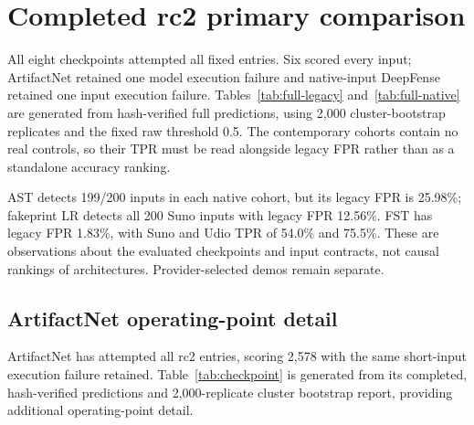 \documentclass[10pt,a4paper]{article}
\begin{document}
\section{Completed rc2 primary comparison}

All eight checkpoints attempted all \BenchEntries{} fixed entries. Six scored
every input; ArtifactNet retained one model execution failure and native-input
DeepFense retained one input execution failure. Tables~\ref{tab:full-legacy}
and~\ref{tab:full-native} are generated from hash-verified full predictions,
using 2,000 cluster-bootstrap replicates and the fixed raw threshold 0.5.
The contemporary cohorts contain no real controls, so their TPR must be read
alongside legacy FPR rather than as a standalone accuracy ranking.

\begin{table}[ht]
\centering\small
\resizebox{\linewidth}{!}{}
\caption{Completed legacy comparison. Failed entries remain in attempted
coverage; metrics use available scores. Intervals are 95\% cluster-bootstrap
percentile intervals. DeepFense uses the native-input condition described below.}
\label{tab:full-legacy}
\end{table}

\begin{table}[ht]
\centering\small

\caption{Completed contemporary-native comparison at raw threshold 0.5.
Bracketed values are 95\% empirical cluster-bootstrap intervals; degenerate
intervals at 0 or 100\% do not establish population certainty.}
\label{tab:full-native}
\end{table}

AST detects 199/200 inputs in each native cohort, but its legacy FPR is
25.98\%; fakeprint LR detects all 200 Suno inputs with legacy FPR 12.56\%.
FST has legacy FPR 1.83\%, with Suno and Udio TPR of 54.0\% and 75.5\%.
These are observations about the evaluated checkpoints and input contracts,
not causal rankings of architectures. Provider-selected demos remain separate.

\subsection{ArtifactNet operating-point detail}

ArtifactNet has attempted all \BenchEntries{} rc2 entries, scoring 2,578 with the
same short-input execution failure retained. Table~\ref{tab:checkpoint} is
generated from its completed, hash-verified predictions and 2,000-replicate
cluster bootstrap report, providing additional operating-point detail.
\end{document}
